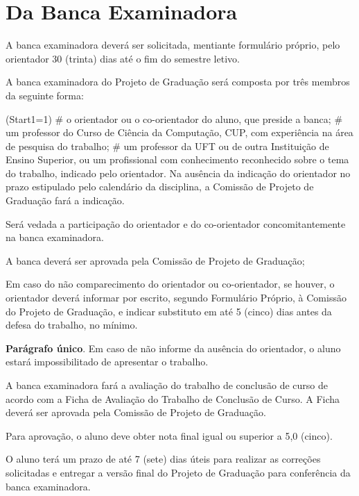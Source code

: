 \documentclass[12pt,geral,titlewithdate]{uftdocs}
\begin{document}
\chapter{Da Banca Examinadora}

\artigo A banca examinadora deverá ser solicitada, mentiante formulário próprio, pelo orientador 30 (trinta) dias até o fim do semestre letivo.

\artigo A banca examinadora do Projeto de Graduação será composta por três membros da seguinte forma:

\begin{easylist}\ListProperties(Start1=1)
# o orientador ou o co-orientador do aluno, que preside a banca;
# um professor do Curso de Ciência da Computação, CUP, com experiência na área de pesquisa do trabalho;
# um professor da UFT ou de outra Instituição de Ensino Superior, ou um
profissional com conhecimento reconhecido sobre o tema do trabalho, indicado pelo orientador. Na ausência da indicação do orientador no prazo estipulado pelo calendário da disciplina, a Comissão de Projeto de Graduação fará a indicação.
\end{easylist}

\begin{paragrafos}
\paragrafo Será vedada a participação do orientador e do co-orientador concomitantemente na banca examinadora.

\paragrafo A banca deverá ser aprovada pela Comissão de Projeto de Graduação;

\end{paragrafos}

\artigo Em caso do não comparecimento do orientador ou co-orientador, se houver, o orientador deverá informar por escrito, segundo Formulário Próprio, à Comissão do Projeto de Graduação, e indicar substituto em até 5 (cinco) dias antes da defesa do trabalho, no mínimo.

{\bf Parágrafo único}. Em caso de não informe da ausência do orientador, o aluno estará impossibilitado de apresentar o trabalho.

\artigo A banca examinadora fará a avaliação do trabalho de conclusão de curso de acordo com a Ficha de Avaliação do Trabalho de Conclusão de Curso. A Ficha deverá ser aprovada pela Comissão de Projeto de Graduação.

\artigo Para aprovação, o aluno deve obter nota final igual ou superior a 5,0 (cinco).

\artigo O aluno terá um prazo de até 7 (sete) dias úteis para realizar as correções solicitadas e entregar a versão final do Projeto de Graduação para conferência da banca examinadora.
\end{document}
